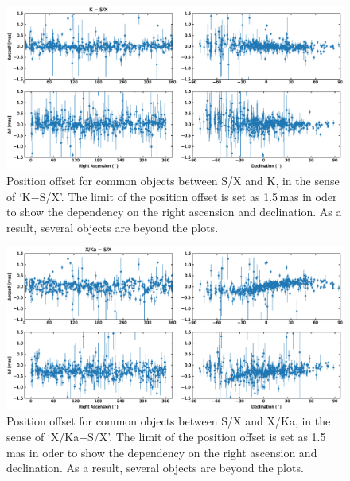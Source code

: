 \documentclass{aa}   %
\begin{document}
\begin{figure}[hbtp]
    \centering
    \includegraphics[width=160mm]{figs/k-sx-pos-offset}
    \caption[]{\label{fig:k-sx-pos-offset}
        Position offset for common objects between S/X and K, in the sense of `K$-$S/X'.
        The limit of the position offset is set as 1.5\,mas in oder to show the dependency on the right ascension and declination.
        As a result, several objects are beyond the plots.
    }
\end{figure}

\begin{figure}[hbtp]
    \centering
    \includegraphics[width=160mm]{figs/xka-sx-pos-offset}
    \caption[]{\label{fig:xka-sx-pos-offset}
        Position offset for common objects between S/X and X/Ka, in the sense of `X/Ka$-$S/X'.
        The limit of the position offset is set as 1.5\,mas in oder to show the dependency on the right ascension and declination.
        As a result, several objects are beyond the plots.
    }
\end{figure}
\end{document}
